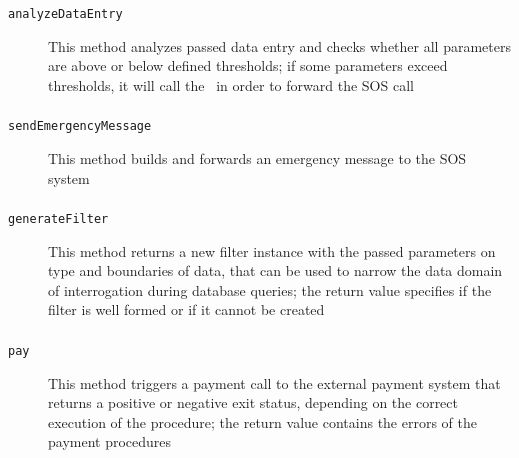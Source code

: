 \documentclass[../DD0.tex]{subfiles}
\begin{document}
    \subsubsection{\EmergencyDetector}

      \begin{description}
        \item[\texttt{analyzeDataEntry}] This method analyzes passed data entry and checks whether all parameters are above or below defined thresholds; if some parameters exceed thresholds, it will call the \EmergencyDispatcher\ in order to forward the SOS call
      \end{description}

    \subsubsection{\EmergencyDispatcher}

      \begin{description}
        \item[\texttt{sendEmergencyMessage}] This method builds and forwards an emergency message to the SOS system
      \end{description}

    \subsubsection{\FilterManager}

      \begin{description}
        \item[\texttt{generateFilter}] This method returns a new filter instance with the passed parameters on type and boundaries of data, that can be used to narrow the data domain of interrogation during database queries; the return value specifies if the filter is well formed or if it cannot be created
      \end{description}

    \subsubsection{\PaymentGateway}

      \begin{description}
        \item[\texttt{pay}] This method triggers a payment call to the external payment system that returns a positive or negative exit status, depending on the correct execution of the procedure; the return value contains the errors of the payment procedures
      \end{description}
\end{document}
